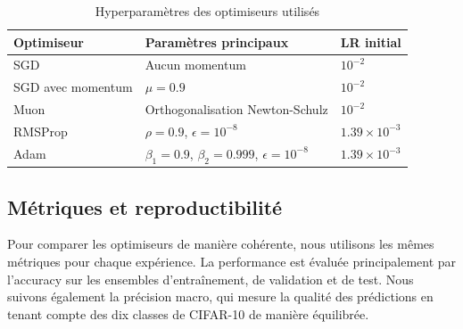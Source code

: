 \documentclass[12pt]{article}
\begin{document}
  \begin{table}[H]
    \centering
    \caption{Hyperparamètres des optimiseurs utilisés}
    \label{tab:optimizer-hparams}
    \begin{tabular}{p{3.2cm}p{6.2cm}p{3.2cm}}
      \toprule
      \textbf{Optimiseur} & \textbf{Paramètres principaux} & \textbf{LR initial} \\
      \midrule
      SGD & Aucun momentum & $10^{-2}$ \\
      SGD avec momentum & $\mu = 0.9$ & $10^{-2}$ \\
      Muon & Orthogonalisation Newton-Schulz & $10^{-2}$ \\
      RMSProp & $\rho = 0.9$, $\epsilon = 10^{-8}$ & $1.39 \times 10^{-3}$ \\
      Adam & $\beta_1 = 0.9$, $\beta_2 = 0.999$, $\epsilon = 10^{-8}$ & $1.39 \times 10^{-3}$ \\
      \bottomrule
    \end{tabular}
  \end{table}



\subsection{Métriques et reproductibilité}

Pour comparer les optimiseurs de manière cohérente, nous utilisons les mêmes
  métriques pour chaque expérience. La performance est évaluée principalement
  par
  l'accuracy sur les ensembles d'entraînement, de validation et de test. Nous
  suivons
  également la précision macro, qui mesure la qualité des prédictions en tenant
  compte
  des dix classes de CIFAR-10 de manière équilibrée.
\end{document}
